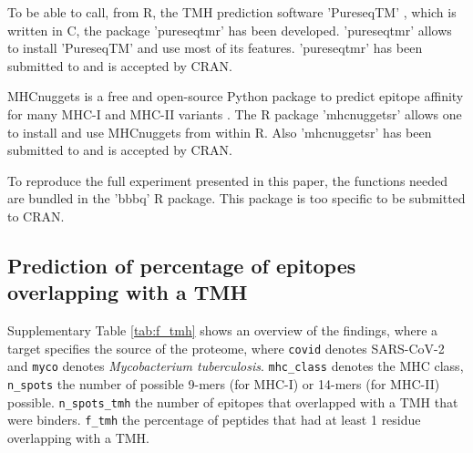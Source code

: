 
To be able to call, from R, the TMH prediction 
software 'PureseqTM' \cite{wang2019efficient},
which is written in C, the package 'pureseqtmr' has been developed. 
'pureseqtmr' allows to install 'PureseqTM' and use most of its features.
'pureseqtmr' has been submitted to and is accepted by CRAN.


MHCnuggets is a free and open-source Python package to predict 
epitope affinity for many MHC-I and MHC-II variants \cite{shao2020high}.
The R package 'mhcnuggetsr' allows one to install and use MHCnuggets
from within R.
Also 'mhcnuggetsr' has been submitted to and is accepted by CRAN.


To reproduce the full experiment presented in this paper,
the functions needed are bundled in the 'bbbq' R package.
This package is too specific to be submitted to CRAN.

\clearpage

\subsection{Prediction of percentage of epitopes overlapping with a TMH}

Supplementary Table \ref{tab:f_tmh} shows an overview of the findings,
where a target specifies the source of the proteome,
where \verb;covid; denotes SARS-CoV-2 and \verb;myco; denotes
\emph{Mycobacterium tuberculosis}. \verb;mhc_class; denotes the MHC
class, \verb;n_spots; the number of possible 9-mers (for MHC-I) 
or 14-mers (for MHC-II) possible. \verb;n_spots_tmh; the
number of epitopes that overlapped with a TMH that were binders. 
\verb;f_tmh; the percentage of peptides that had at least 1 residue
overlapping with a TMH.

